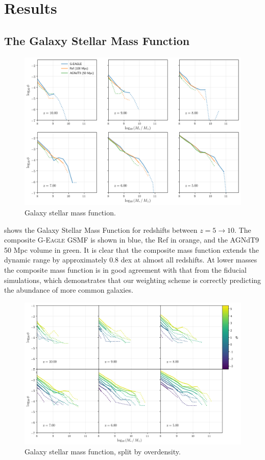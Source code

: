 \section{Results}

\subsection{The Galaxy Stellar Mass Function}

\begin{figure}
	\includegraphics[width=\textwidth]{images/gsmf_multi.png}
    \caption{Galaxy stellar mass function.}
    \label{fig:gsmf_multi}
\end{figure}

 shows the Galaxy Stellar Mass Function for redshifts between $z = 5 \rightarrow 10$.
The composite \textsc{G-Eagle} GSMF is shown in blue, the Ref in orange, and the AGNdT9 50 Mpc volume in green.
It is clear that the composite mass function extends the dynamic range by approximately 0.8 dex at almost all redshifts.
At lower masses the composite mass function is in good agreement with that from the fiducial simulations, which demonstrates that our weighting scheme is correctly predicting the abundance of more common galaxies.

\begin{figure}
	\includegraphics[width=\textwidth]{images/gsmf_multi_split.png}
    \caption{Galaxy stellar mass function, split by overdensity.}
    \label{fig:gsmf_multi_split}
\end{figure}

